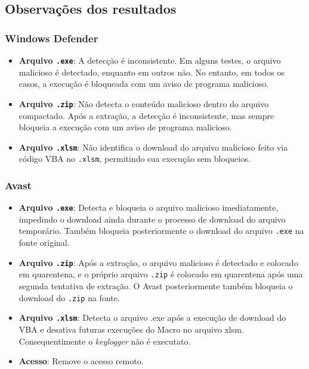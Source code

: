 \documentclass[12pt]{article}
\begin{document}
\subsection{Observações dos resultados}
\subsubsection*{Windows Defender}
\begin{itemize}
    \item \textbf{Arquivo \texttt{.exe}}: A detecção é inconsistente. Em alguns testes, o arquivo malicioso é detectado, enquanto em outros não. No entanto, em todos os casos, a execução é bloqueada com um aviso de programa malicioso.
    \item \textbf{Arquivo \texttt{.zip}}: Não detecta o conteúdo malicioso dentro do arquivo compactado. Após a extração, a detecção é inconsistente, mas sempre bloqueia a execução com um aviso de programa malicioso.
    \item \textbf{Arquivo \texttt{.xlsm}}: Não identifica o download do arquivo malicioso feito via código VBA no \texttt{.xlsm}, permitindo sua execução sem bloqueios.
\end{itemize}

\subsubsection*{Avast}
\begin{itemize}
    \item \textbf{Arquivo \texttt{.exe}}: Detecta e bloqueia o arquivo malicioso imediatamente, impedindo o download ainda durante o processo de download do arquivo temporário. Também bloqueia posteriormente o download do arquivo \texttt{.exe} na fonte original.
    \item \textbf{Arquivo \texttt{.zip}}: Após a extração, o arquivo malicioso é detectado e colocado em quarentena, e o próprio arquivo \texttt{.zip} é colocado em quarentena após uma segunda tentativa de extração. O Avast posteriormente também bloqueia o download do \texttt{.zip} na fonte.
    \item \textbf{Arquivo \texttt{.xlsm}}:  Detecta o arquivo .exe após a execução de download do VBA e desativa futuras execuções do Macro no arquivo xlsm. Consequentimente o \textit{keylogger} não é executato.
    \item \textbf{Acesso}: Remove o acesso remoto.
\end{itemize}
\end{document}
